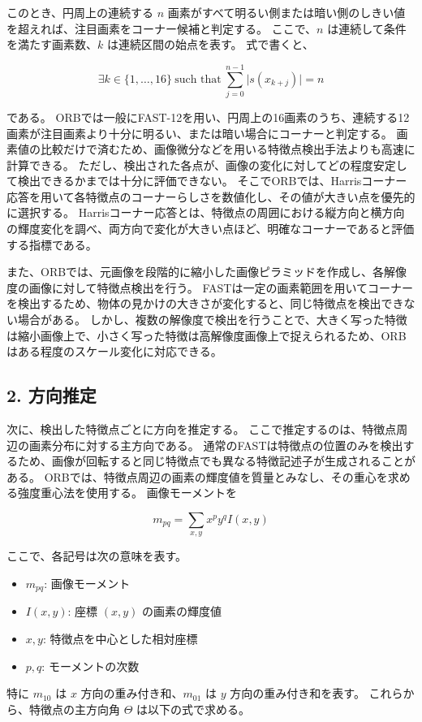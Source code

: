 \documentclass[11pt,a4paper]{ltjsarticle}
\begin{document}
このとき、円周上の連続する $n$ 画素がすべて明るい側または暗い側のしきい値を超えれば、注目画素をコーナー候補と判定する。
ここで、$n$ は連続して条件を満たす画素数、$k$ は連続区間の始点を表す。
式で書くと、

\begin{equation}
\exists k \in \{1,\dots,16\}\ \text{such that}\ \sum_{j=0}^{n-1}\lvert s(x_{k+j})\rvert = n
\label{eq:fast-contiguous}
\end{equation}

である。
ORBでは一般にFAST-12を用い、円周上の16画素のうち、連続する12画素が注目画素より十分に明るい、または暗い場合にコーナーと判定する。
画素値の比較だけで済むため、画像微分などを用いる特徴点検出手法よりも高速に計算できる。
ただし、検出された各点が、画像の変化に対してどの程度安定して検出できるかまでは十分に評価できない。
そこでORBでは、Harrisコーナー応答を用いて各特徴点のコーナーらしさを数値化し、その値が大きい点を優先的に選択する。
Harrisコーナー応答とは、特徴点の周囲における縦方向と横方向の輝度変化を調べ、両方向で変化が大きい点ほど、明確なコーナーであると評価する指標である。

また、ORBでは、元画像を段階的に縮小した画像ピラミッドを作成し、各解像度の画像に対して特徴点検出を行う。
FASTは一定の画素範囲を用いてコーナーを検出するため、物体の見かけの大きさが変化すると、同じ特徴点を検出できない場合がある。
しかし、複数の解像度で検出を行うことで、大きく写った特徴は縮小画像上で、小さく写った特徴は高解像度画像上で捉えられるため、ORBはある程度のスケール変化に対応できる。

\subsection*{2. 方向推定}

次に、検出した特徴点ごとに方向を推定する。
ここで推定するのは、特徴点周辺の画素分布に対する主方向である。
通常のFASTは特徴点の位置のみを検出するため、画像が回転すると同じ特徴点でも異なる特徴記述子が生成されることがある。
ORBでは、特徴点周辺の画素の輝度値を質量とみなし、その重心を求める強度重心法を使用する。
画像モーメントを

\begin{equation}
m_{pq}=\sum_{x,y} x^p y^q I(x,y)
\label{eq:moment}
\end{equation}

ここで、各記号は次の意味を表す。
\begin{itemize}
\item $m_{pq}$: 画像モーメント
\item $I(x,y)$: 座標 $(x,y)$ の画素の輝度値
\item $x,y$: 特徴点を中心とした相対座標
\item $p,q$: モーメントの次数
\end{itemize}
特に $m_{10}$ は $x$ 方向の重み付き和、$m_{01}$ は $y$ 方向の重み付き和を表す。
これらから、特徴点の主方向角 $\Theta$ は以下の式で求める。
\end{document}
